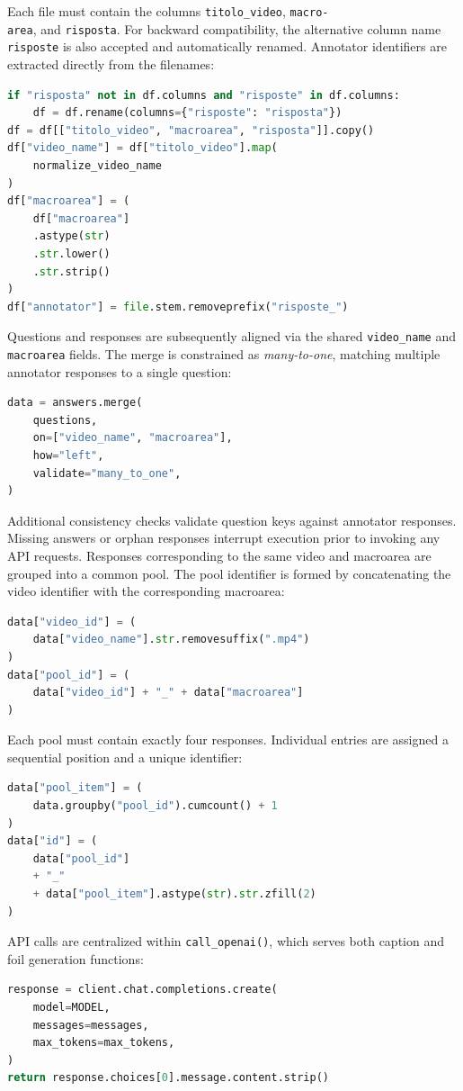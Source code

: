 Each file must contain the columns \texttt{titolo\_video}, \texttt{macro-\\area}, and \texttt{risposta}. For backward compatibility, the alternative column name \texttt{risposte} is also accepted and automatically renamed. Annotator identifiers are extracted directly from the filenames:
\begin{lstlisting}[language=Python]
if "risposta" not in df.columns and "risposte" in df.columns:
    df = df.rename(columns={"risposte": "risposta"})
df = df[["titolo_video", "macroarea", "risposta"]].copy()
df["video_name"] = df["titolo_video"].map(
    normalize_video_name
)
df["macroarea"] = (
    df["macroarea"]
    .astype(str)
    .str.lower()
    .str.strip()
)
df["annotator"] = file.stem.removeprefix("risposte_")
\end{lstlisting}
Questions and responses are subsequently aligned via the shared \texttt{video\_name} and \texttt{macroarea} fields. The merge is constrained as \textit{many-to-one}, matching multiple annotator responses to a single question:
\begin{lstlisting}[language=Python]
data = answers.merge(
    questions,
    on=["video_name", "macroarea"],
    how="left",
    validate="many_to_one",
)
\end{lstlisting}
Additional consistency checks validate question keys against annotator responses. Missing answers or orphan responses interrupt execution prior to invoking any API requests.
Responses corresponding to the same video and macroarea are grouped into a common pool. The pool identifier is formed by concatenating the video identifier with the corresponding macroarea:
\begin{lstlisting}[language=Python]
data["video_id"] = (
    data["video_name"].str.removesuffix(".mp4")
)
data["pool_id"] = (
    data["video_id"] + "_" + data["macroarea"]
)
\end{lstlisting}
Each pool must contain exactly four responses. Individual entries are assigned a sequential position and a unique identifier:
\begin{lstlisting}[language=Python]
data["pool_item"] = (
    data.groupby("pool_id").cumcount() + 1
)
data["id"] = (
    data["pool_id"]
    + "_"
    + data["pool_item"].astype(str).str.zfill(2)
)
\end{lstlisting}
API calls are centralized within \texttt{call\_openai()}, which serves both caption and foil generation functions:
\begin{lstlisting}[language=Python]
response = client.chat.completions.create(
    model=MODEL,
    messages=messages,
    max_tokens=max_tokens,
)
return response.choices[0].message.content.strip()
\end{lstlisting}
